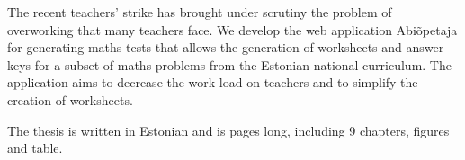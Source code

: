 The recent teachers' strike has brought under scrutiny the problem of overworking that many teachers face. We develop the web application Abiõpetaja for generating maths tests that allows the generation of worksheets and answer keys for a subset of maths problems from the Estonian national curriculum. The application aims to decrease the work load on teachers and to simplify the creation of worksheets.

The thesis is written in Estonian and is  pages long, including 9 chapters,  figures and  table.

